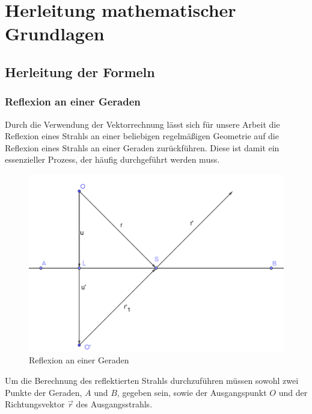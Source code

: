 \documentclass[a4paper, 11pt]{scrartcl}
\begin{document}

\section{Herleitung mathematischer Grundlagen}

\subsection{Herleitung der Formeln}\label{sec:herleitung}

\subsubsection{Reflexion an einer Geraden}
Durch die Verwendung der Vektorrechnung lässt sich für unsere Arbeit die Reflexion eines Strahls an einer beliebigen regelmäßigen Geometrie auf die Reflexion eines Strahls an einer Geraden zurückführen. 
Diese ist damit ein essenzieller Prozess, der häufig durchgeführt werden muss.\\
\begin{figure}
\includegraphics[scale=0.4]{pictures/LineRef.png}
\caption{Reflexion an einer Geraden}
\end{figure}
Um die Berechnung des reflektierten Strahls durchzuführen müssen sowohl zwei Punkte der Geraden, $A$ und $B$, gegeben sein, sowie der Ausgangspunkt $O$ und der Richtungsvektor $\vec{r}$ des Ausgangsstrahls. 
\end{document}
